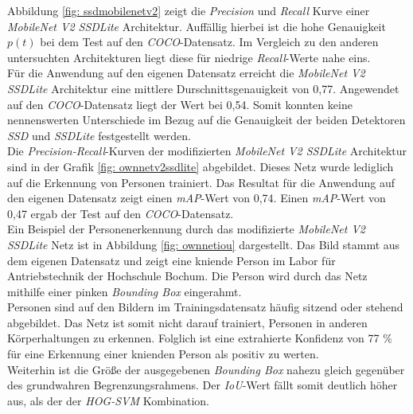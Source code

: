 

Abbildung \ref{fig: ssdmobilenetv2} zeigt die \textit{Precision} und \textit{Recall} Kurve einer \textit{MobileNet V2 SSDLite} Architektur. Auffällig hierbei ist die hohe Genauigkeit $p(t)$ bei dem Test auf den \textit{COCO}-Datensatz. Im Vergleich zu den anderen untersuchten Architekturen liegt diese für niedrige \textit{Recall}-Werte nahe eins.\\

 Für die Anwendung auf den eigenen Datensatz erreicht die \textit{MobileNet V2 SSDLite} Architektur eine mittlere Durschnittsgenauigkeit von 0,77. Angewendet auf den \textit{COCO}-Datensatz liegt der Wert bei 0,54. Somit konnten  keine nennenswerten Unterschiede im Bezug auf die Genauigkeit der beiden Detektoren \textit{SSD} und \textit{SSDLite} festgestellt werden. \\
 
 Die \textit{Precision-Recall}-Kurven der modifizierten \textit{MobileNet V2 SSDLite} Architektur sind in der Grafik \ref{fig: ownnetv2ssdlite} abgebildet. Dieses Netz wurde lediglich auf die Erkennung von Personen trainiert. Das Resultat für die Anwendung auf den eigenen Datensatz zeigt einen \textit{mAP}-Wert von 0,74. Einen \textit{mAP}-Wert von 0,47 ergab der Test auf den \textit{COCO}-Datensatz.\\ 

 

 
  


Ein Beispiel der Personenerkennung durch das modifizierte \textit{MobileNet V2 SSDLite} Netz ist in Abbildung \ref{fig: ownnetiou} dargestellt. Das Bild stammt aus dem eigenen Datensatz und zeigt eine kniende Person im Labor für Antriebstechnik der Hochschule Bochum. Die Person wird durch das Netz mithilfe einer pinken \textit{Bounding Box} eingerahmt.\\

Personen sind auf den Bildern im Trainingsdatensatz häufig sitzend oder stehend abgebildet. Das Netz ist somit nicht darauf trainiert, Personen in anderen Körperhaltungen zu erkennen. Folglich ist eine extrahierte Konfidenz von 77 \% für eine Erkennung einer knienden Person als positiv zu werten.\\

Weiterhin ist die Größe der ausgegebenen \textit{Bounding Box} nahezu gleich gegenüber des grundwahren Begrenzungsrahmens. Der \textit{IoU}-Wert fällt somit deutlich höher aus, als der der \textit{HOG-SVM} Kombination.

